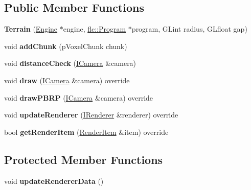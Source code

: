 \subsection*{Public Member Functions}
\begin{DoxyCompactItemize}
\item 
\mbox{\label{classflw_1_1flf_1_1Terrain_a320fed070586b7554bd65ce73d871abb}} 
{\bfseries Terrain} (\hyperlink{classflw_1_1Engine}{Engine} $\ast$engine, \hyperlink{classflw_1_1flc_1_1Program}{flc\+::\+Program} $\ast$program, G\+Lint radius, G\+Lfloat gap)
\item 
\mbox{\label{classflw_1_1flf_1_1Terrain_ad22486020cfa8b20f38294967df5ecc3}} 
void {\bfseries add\+Chunk} (p\+Voxel\+Chunk chunk)
\item 
\mbox{\label{classflw_1_1flf_1_1Terrain_a3b03ccdfdf93ad1573764f4513f2b5e8}} 
void {\bfseries distance\+Check} (\hyperlink{classflw_1_1flf_1_1ICamera}{I\+Camera} \&camera)
\item 
\mbox{\label{classflw_1_1flf_1_1Terrain_a4d6fcc4d73732ed6ba19c2ac532c6d96}} 
void {\bfseries draw} (\hyperlink{classflw_1_1flf_1_1ICamera}{I\+Camera} \&camera) override
\item 
\mbox{\label{classflw_1_1flf_1_1Terrain_a7dcfe6d21a4fd149ccba0d02291b64b4}} 
void {\bfseries draw\+P\+B\+RP} (\hyperlink{classflw_1_1flf_1_1ICamera}{I\+Camera} \&camera) override
\item 
\mbox{\label{classflw_1_1flf_1_1Terrain_a77b1d31a8a673018266a4c324f629a02}} 
void {\bfseries update\+Renderer} (\hyperlink{classflw_1_1flf_1_1IRenderer}{I\+Renderer} \&renderer) override
\item 
\mbox{\label{classflw_1_1flf_1_1Terrain_a8fbfe9d71054538cc143c2c8966b3f0b}} 
bool {\bfseries get\+Render\+Item} (\hyperlink{structflw_1_1flf_1_1RenderItem}{Render\+Item} \&item) override
\end{DoxyCompactItemize}
\subsection*{Protected Member Functions}
\begin{DoxyCompactItemize}
\item 
\mbox{\label{classflw_1_1flf_1_1Terrain_a63ba1f58a158096874558bfccd15ae7f}} 
void {\bfseries update\+Renderer\+Data} ()
\end{DoxyCompactItemize}
